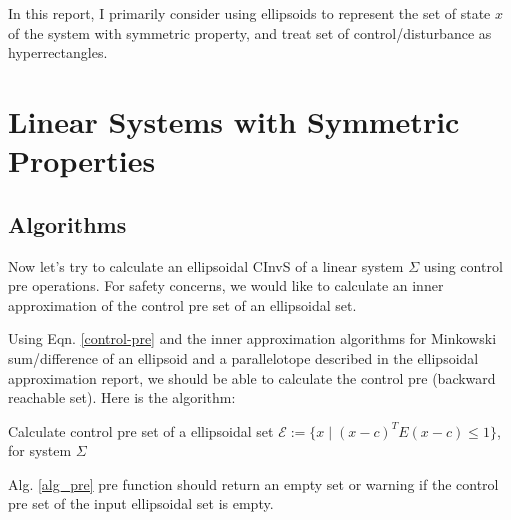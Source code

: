 \documentclass{article}
\begin{document}
In this report, I primarily consider using ellipsoids to represent the set of state $x$ of the system with symmetric property, and treat set of control/disturbance as hyperrectangles.

\section{Linear Systems with Symmetric Properties}

\subsection{Algorithms}
Now let's try to calculate an ellipsoidal CInvS of a linear system $\Sigma$ using control pre operations. For safety concerns, we would like to calculate an inner approximation of the control pre set of an ellipsoidal set. 

Using Eqn. \ref{control-pre} and the inner approximation algorithms for Minkowski sum/difference of an ellipsoid and a parallelotope described in the ellipsoidal approximation report, we should be able to calculate the control pre (backward reachable set). Here is the algorithm:

\begin{algorithm}[H]
	\centering
	\caption{Calculate control pre set of a ellipsoidal set $\mathcal E := \{x\;|\;(x-c)^T E (x-c) \leq 1\}$, for system $\Sigma$}
\begin{algorithmic}[1]
	\State{}
	\State{}
	\EndFunction
\end{algorithmic}
\label{alg_pre}
\end{algorithm}

Alg. \ref{alg_pre} pre function should return an empty set or warning if the control pre set of the input ellipsoidal set is empty.
\end{document}

